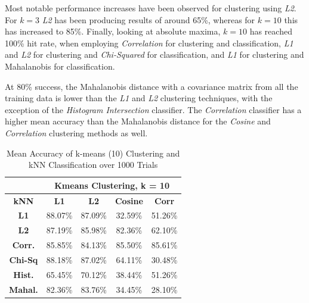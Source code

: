 \documentclass[10pt,twocolumn,letterpaper]{article}
\begin{document}
Most notable performance increases have been observed for clustering using \textit{L2}. For $k=3$ \textit{L2} has been producing results of around 65\%, whereas for $k=10$ this has increased to 85\%. Finally, looking at absolute maxima, $k=10$ has reached 100\% hit rate, when employing \textit{Correlation} for clustering and classification, \textit{L1} and \textit{L2} for clustering and \textit{Chi-Squared} for classification, and \textit{L1} for clustering and Mahalanobis for classification.

At 80\% success, the Mahalanobis distance with a covariance matrix from all the training data is lower than the \textit{L1} and \textit{L2} clustering techniques, with the exception of the \textit{Histogram Intersection} classifier. The \textit{Correlation} classifier has a higher mean accuracy than the Mahalanobis distance for the \textit{Cosine} and \textit{Correlation} clustering methods as well.


\begin{table}[H]
\caption{Mean Accuracy of k-means (10) Clustering and kNN Classification over 1000 Trials \label{tab:kmeans10}}
\footnotesize
\begin{center}
\begin{tabular}{|c| c c c c|}
\cline{2-5}
\multicolumn{1}{c|}{ } & \multicolumn{4}{|c|}{\bf Kmeans Clustering, k = 10} \\
\hline

\bf kNN &\bf L1 &\bf L2 &\bf Cosine &\bf Corr \\ [0.5ex]
\hline
\bf L1 & 88.07\% & 87.09\%  & 32.59\% & 51.26\%\\ [0.5ex]
\hline
\bf L2 & 87.19\% & 85.98\%  & 82.36\% & 62.10\%\\ [0.5ex]
\hline
\bf Corr. & 85.85\% & 84.13\%  & 85.50\% & 85.61\%\\ [0.5ex]
\hline
\bf Chi-Sq & 88.18\% & 87.02\%  & 64.11\% & 30.48\%\\ [0.5ex]
\hline
\bf Hist. & 65.45\% & 70.12\%  & 38.44\% & 51.26\%\\ [0.5ex]
\hline
\bf Mahal. & 82.36\% & 83.76\% & 34.45\% & 28.10\%\\ [0.5ex]
\hline
\end{tabular}
\end{center}
\end{table}
\end{document}
